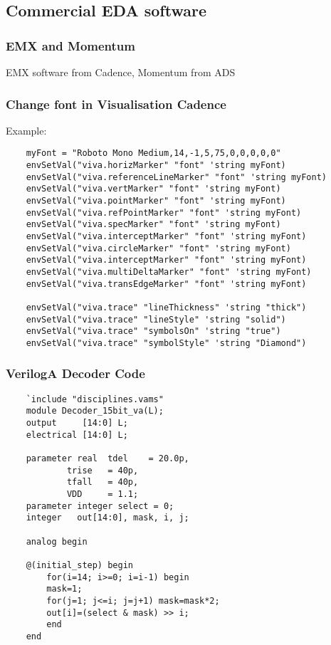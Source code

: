 \subsection{Commercial EDA software}

\subsubsection*{EMX and Momentum}
EMX software from Cadence, Momentum from ADS

\newpage

\subsubsection{Change font in Visualisation Cadence}

Example:

\begin{verbatim}
	myFont = "Roboto Mono Medium,14,-1,5,75,0,0,0,0,0"
	envSetVal("viva.horizMarker" "font" 'string myFont)
	envSetVal("viva.referenceLineMarker" "font" 'string myFont)
	envSetVal("viva.vertMarker" "font" 'string myFont)
	envSetVal("viva.pointMarker" "font" 'string myFont)
	envSetVal("viva.refPointMarker" "font" 'string myFont)
	envSetVal("viva.specMarker" "font" 'string myFont)
	envSetVal("viva.interceptMarker" "font" 'string myFont)
	envSetVal("viva.circleMarker" "font" 'string myFont)
	envSetVal("viva.interceptMarker" "font" 'string myFont)
	envSetVal("viva.multiDeltaMarker" "font" 'string myFont)
	envSetVal("viva.transEdgeMarker" "font" 'string myFont)

	envSetVal("viva.trace" "lineThickness" 'string "thick")
	envSetVal("viva.trace" "lineStyle" 'string "solid")
	envSetVal("viva.trace" "symbolsOn" 'string "true")
	envSetVal("viva.trace" "symbolStyle" 'string "Diamond")
\end{verbatim}


\subsubsection{VerilogA Decoder Code}

\begin{file}
	\begin{lstlisting}
	`include "disciplines.vams"
	module Decoder_15bit_va(L);
	output     [14:0] L;
	electrical [14:0] L;

	parameter real 	tdel 	= 20.0p,
			trise	= 40p,
			tfall	= 40p,
			VDD 	= 1.1;
	parameter integer select = 0;
	integer   out[14:0], mask, i, j;

	analog begin
	
	@(initial_step) begin
		for(i=14; i>=0; i=i-1) begin
		mask=1;
		for(j=1; j<=i; j=j+1) mask=mask*2;
		out[i]=(select & mask) >> i;
		end
	end
	\end{lstlisting}
\end{file}

